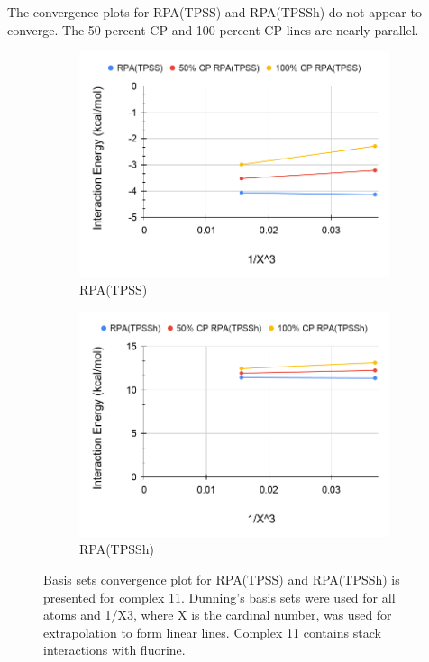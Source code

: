 \documentclass[11pt]{article}
\begin{document}
The convergence plots for RPA(TPSS) and RPA(TPSSh) do not appear to
converge. The 50 percent CP and 100 percent CP lines are nearly parallel.


\begin{figure}[H]
  \centering
  \begin{subfigure}{.5\textwidth}
    \centering
    \includegraphics[scale=0.3]{tpss-11.png}
    \caption{RPA(TPSS)}
    \label{fig:tpss11}
  \end{subfigure}%
  \begin{subfigure}{.5\textwidth}
    \centering
    \includegraphics[scale=0.3]{tpssh-11.png}
    \caption{RPA(TPSSh)}
    \label{fig:tpssh_11}
  \end{subfigure}
  \caption{Basis sets convergence plot for RPA(TPSS) and RPA(TPSSh) is
    presented for complex 11. Dunning's basis sets were used for all
    atoms and 1/X3, where X is the cardinal number, was used for
    extrapolation to form linear lines. Complex 11 contains stack
    interactions with fluorine.}
  \label{fig:complex_11}
\end{figure}
\end{document}
